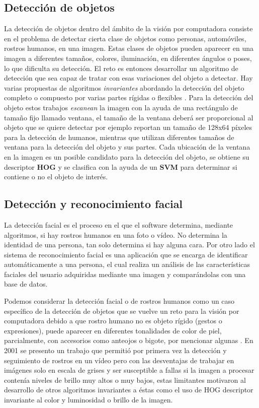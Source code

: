 \documentclass{article}
\begin{document}
\subsection*{Detección de objetos}
La detección de objetos dentro del ámbito de la visión por computadora consiste en el problema de detectar cierta clase de objetos como personas, automóviles, rostros humanos, en una imagen. Estas clases de objetos pueden aparecer en una imagen a diferentes tamaños, colores, iluminación, en diferentes ángulos o poses, lo que dificulta su detección. El reto es entonces desarrollar un algoritmo de detección que sea capaz de tratar con esas variaciones del objeto a detectar. Hay varias propuestas de algoritmos \textit{invariantes} abordando la detección del objeto completo \cite{dalal-triggs} o compuesto por varias partes rígidas o flexibles \cite{hog-parts1} \cite{hog-parts2}. Para la detección del objeto estos trabajos \textit{escanean} la imagen con la ayuda de una rectángulo de tamaño fijo llamado ventana, el tamaño de la ventana deberá ser proporcional al objeto que se quiere detectar por ejemplo \cite{dalal-triggs} reportan un tamaño de 128x64 píxeles para la detección de humanos, mientras que \cite{hog-parts1} \cite{hog-parts2} utilizan diferentes tamaños de ventana para la detección del objeto y sus partes. Cada ubicación de la ventana en la imagen es un posible candidato para la detección del objeto, se obtiene su  descriptor \textbf{HOG} y se clasifica con la ayuda de un \textbf{SVM} para determinar si contiene o no el objeto de interés. 
\subsection*{Detección y reconocimiento facial}
La detección facial es el proceso en el que el software determina, mediante algoritmos, si hay rostros humanos en una foto o vídeo. No determina la identidad de una persona, tan solo determina si hay alguna cara. Por otro lado el sistema de reconocimiento facial es una aplicación que se encarga de identificar automáticamente a una persona, el cual realiza un  análisis  de  las  características  faciales  del  usuario adquiridas mediante una imagen  y comparándolas con una base de datos. 

Podemos considerar la detección facial o de rostros humanos como un caso específico de la detección de objetos que se vuelve un reto para la visión por computadora debido a que rostro humano no es objeto rígido (gestos o expresiones), puede aparecer en diferentes tonalidades de color de piel, parcialmente, con accesorios como anteojos o bigote, por mencionar algunas \cite{caras-resumen}. 
En 2001 se presento un trabajo que permitió por primera vez la detección y seguimiento de rostros en un vídeo \cite{viola-jones} pero con las desventajas de trabajar en imágenes solo en escala de grises y ser susceptible a fallas si la imagen a procesar contenía niveles de brillo muy altos o muy bajos, estas limitantes motivaron al desarrollo de otros algoritmos invariantes a éstas como el uso de HOG descriptor invariante al color y luminosidad o brillo de la imagen.
\end{document}
